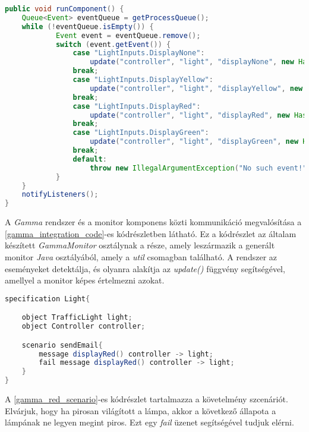 \begin{lstlisting}[language=java, frame=single, float=ht!, caption={Monitor komponenshez tartozó kódrészlet.},captionpos=b,label=gamma_integration_code]
public void runComponent() {
    Queue<Event> eventQueue = getProcessQueue();
    while (!eventQueue.isEmpty()) {
            Event event = eventQueue.remove();
            switch (event.getEvent()) {
                case "LightInputs.DisplayNone":
                    update("controller", "light", "displayNone", new HashMap<String, Object>());
                break;
                case "LightInputs.DisplayYellow":
                    update("controller", "light", "displayYellow", new HashMap<String, Object>());
                break;
                case "LightInputs.DisplayRed":
                    update("controller", "light", "displayRed", new HashMap<String, Object>());
                break;
                case "LightInputs.DisplayGreen":
                    update("controller", "light", "displayGreen", new HashMap<String, Object>());
                break;
                default:
                    throw new IllegalArgumentException("No such event!");
            }
    }
    notifyListeners();
}
\end{lstlisting}

A \textit{Gamma} rendszer és a monitor komponens közti kommunikáció megvalósítása a \ref{gamma_integration_code}-es kódrészletben látható.
Ez a kódrészlet az általam készített \textit{GammaMonitor} osztálynak a része, amely leszármazik a generált monitor \textit{Java} osztályából, amely a \textit{util} csomagban található.
A rendszer az eseményeket detektálja, és olyanra alakítja az \textit{update()} függvény segítségével, amellyel a monitor képes értelmezni azokat.

\begin{lstlisting}[language=java, frame=single, float=ht!, caption={Szcenárió szöveges leírása.},captionpos=b, label=gamma_red_scenario]
specification Light{

    object TrafficLight light;
    object Controller controller;

    scenario sendEmail{
        message displayRed() controller -> light;
        fail message displayRed() controller -> light;
    }
}
\end{lstlisting}

A \ref{gamma_red_scenario}-es kódrészlet tartalmazza a követelmény szcenáriót.
Elvárjuk, hogy ha pirosan világított a lámpa, akkor a következő állapota a lámpának ne legyen megint piros.
Ezt egy \textit{fail} üzenet segítségével tudjuk elérni.

